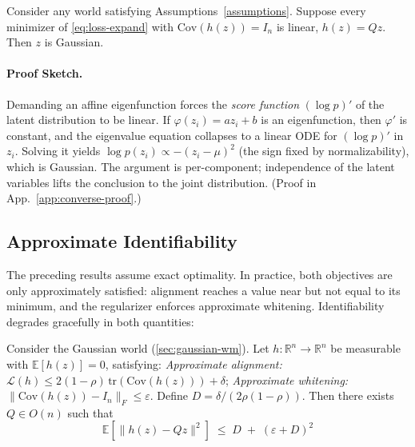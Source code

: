 \documentclass{article}
\makeatletter
\newcounter{thmcounter}
\renewcommand{\thethmcounter}{\arabic{thmcounter}}
\newcommand{\thmlabel}[1]{\protected@edef\@currentlabel{\thethmcounter}\label{#1}}
\makeatother
\begin{document}
\begin{theorembox}
\thmlabel{thm:converse}
Consider any world satisfying Assumptions~\ref{assumptions}. Suppose every minimizer of \eqref{eq:loss-expand} with $\mathrm{Cov}(h(z)) = I_n$ is linear, $h(z) = Qz$. Then $z$ is Gaussian.
\end{theorembox}

\paragraph{Proof Sketch.} 
Demanding an affine eigenfunction forces the \emph{score function} $(\log p)'$ of the latent distribution to be linear.
If $\varphi(z_i) = a z_i + b$ is an eigenfunction, then $\varphi'$ is constant, and the eigenvalue equation collapses to a linear ODE for $(\log p)'$ in $z_i$.
Solving it yields $\log p(z_i) \propto -(z_i - \mu)^2$ (the sign fixed by normalizability), which is Gaussian.
The argument is per-component; independence of the latent variables lifts the conclusion to the joint distribution.
(Proof in App.~\ref{app:converse-proof}.)



\subsection{Approximate Identifiability}\label{sec:approx}

The preceding results assume exact optimality.
In practice, both objectives are only approximately satisfied: alignment reaches a value near but not equal to its minimum, and the regularizer enforces approximate whitening.
Identifiability degrades gracefully in both quantities:

\begin{theorembox}
\thmlabel{thm:approx}
Consider the Gaussian world (\ref{sec:gaussian-wm}). Let $h: \mathbb{R}^n \to \mathbb{R}^n$ be measurable with $\mathbb{E}[h(z)] = 0$, satisfying:
\textit{Approximate alignment:} $\mathcal{L}(h) \leq 2(1-\rho)\,\mathrm{tr}(\mathrm{Cov}(h(z))) + \delta$;
\textit{Approximate whitening:} $\|\mathrm{Cov}(h(z)) - I_n\|_F \leq \varepsilon$.
Define $D = \delta/(2\rho(1-\rho))$. Then there exists $Q \in O(n)$ such that
\begin{equation}\label{eq:stability}
    \mathbb{E}\!\left[\|h(z) - Qz\|^2\right] \;\leq\; D \;+\; (\varepsilon + D)^2
\end{equation}
\end{theorembox}
\end{document}
